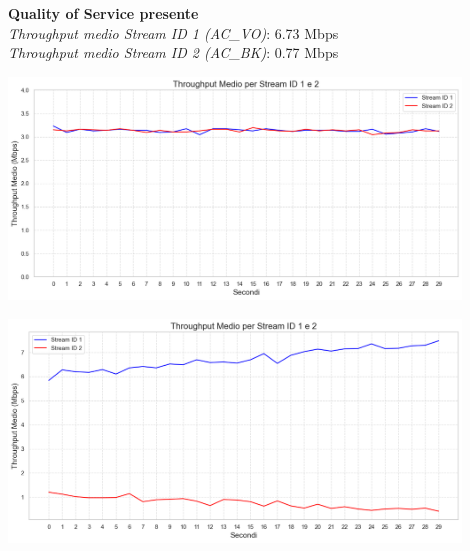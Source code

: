 \documentclass[aspectratio=169]{beamer}
\begin{document}
\begin{frame}
\begin{minipage}{0.9\textwidth}
\begin{minipage}{0.45\textwidth}
            \textbf{Quality of Service presente}\\
            \textit{Throughput medio Stream ID 1 (AC\_VO)}: 6.73 Mbps\\
            \textit{Throughput medio Stream ID 2 (AC\_BK)}: 0.77 Mbps\\
        \end{minipage}
        \hfill
        \begin{minipage}{0.5\textwidth}
            \centering
            \begin{minipage}{\textwidth}
                \includegraphics[width=0.9\textwidth]{t1_c1_main.png}
                \vspace{0.5cm}
            \end{minipage}
            \begin{minipage}{\textwidth}
                \includegraphics[width=0.9\textwidth]{t2_c1_main.png}
            \end{minipage}
        \end{minipage}
    \end{minipage}
\end{frame}
\end{document}
